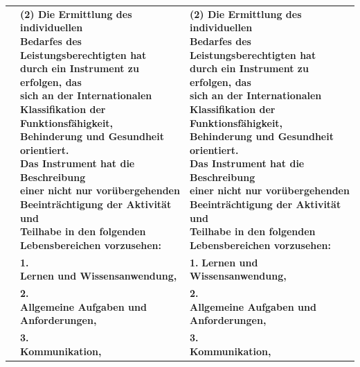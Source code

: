 \documentclass[10pt,a4paper,landscape]{article}
\begin{document}
\begin{longtable}{|L{8.2cm}|L{8.2cm}|L{8.2cm}|}
 & \textbf{(2) Die Ermittlung des individuellen  \newline Bedarfes des Leistungsberechtigten hat  \newline durch ein Instrument zu erfolgen, das  \newline sich an der Internationalen  \newline Klassifikation der Funktionsfähigkeit,  \newline Behinderung und Gesundheit orientiert.  \newline Das Instrument hat die Beschreibung  \newline einer nicht nur vorübergehenden  \newline Beeinträchtigung der Aktivität und  \newline Teilhabe in den folgenden  \newline Lebensbereichen vorzusehen: } & \textbf{(2) Die Ermittlung des individuellen  \newline Bedarfes des Leistungsberechtigten hat  \newline durch ein Instrument zu erfolgen, das  \newline sich an der Internationalen  \newline Klassifikation der Funktionsfähigkeit,  \newline Behinderung und Gesundheit orientiert.  \newline Das Instrument hat die Beschreibung  \newline einer nicht nur vorübergehenden  \newline Beeinträchtigung der Aktivität und  \newline Teilhabe in den folgenden  \newline Lebensbereichen vorzusehen: } \\
\hhline{|---|}
 & \textbf{1.   \newline Lernen und Wissensanwendung, } & \textbf{1.  } \textbf{Lernen und Wissensanwendung, } \\
\hhline{|---|}
 & \textbf{2.   \newline Allgemeine Aufgaben und  \newline Anforderungen, } & \textbf{2.   \newline Allgemeine Aufgaben und  \newline Anforderungen, } \\
\hhline{|---|}
 & \textbf{3.   \newline Kommunikation, } & \textbf{3.   \newline Kommunikation, } \\

\end{longtable}
\end{document}
